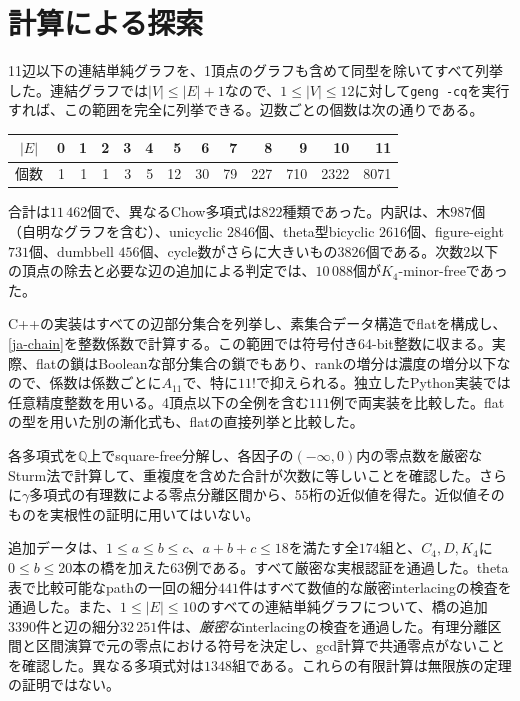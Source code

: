 \documentclass[12pt]{amsart}
\theoremstyle{definition}
\theoremstyle{remark}
\numberwithin{equation}{section}
\newcommand{\Q}{\mathbb{Q}}
\begin{document}
\section{計算による探索}
11辺以下の連結単純グラフを、1頂点のグラフも含めて同型を除いてすべて列挙した。連結グラフでは$|V|\leq|E|+1$なので、$1\leq|V|\leq12$に対して\texttt{geng -cq}を実行すれば、この範囲を完全に列挙できる。辺数ごとの個数は次の通りである。
\begin{center}\small
\begin{tabular}{c|rrrrrrrrrrrr}
$|E|$&0&1&2&3&4&5&6&7&8&9&10&11\\\hline
個数&1&1&1&3&5&12&30&79&227&710&2322&8071
\end{tabular}
\end{center}
合計は$11\,462$個で、異なるChow多項式は$822$種類であった。内訳は、木$987$個（自明なグラフを含む）、unicyclic $2846$個、theta型bicyclic $2616$個、figure-eight $731$個、dumbbell $456$個、cycle数がさらに大きいもの$3826$個である。次数2以下の頂点の除去と必要な辺の追加による判定では、$10\,088$個が$K_4$-minor-freeであった。

C++の実装はすべての辺部分集合を列挙し、素集合データ構造でflatを構成し、\eqref{ja-chain}を整数係数で計算する。この範囲では符号付き64-bit整数に収まる。実際、flatの鎖はBooleanな部分集合の鎖でもあり、rankの増分は濃度の増分以下なので、係数は係数ごとに$A_{11}$で、特に$11!$で抑えられる。独立したPython実装では任意精度整数を用いる。4頂点以下の全例を含む$111$例で両実装を比較した。flatの型を用いた別の漸化式も、flatの直接列挙と比較した。

各多項式を$\Q$上でsquare-free分解し、各因子の$(-\infty,0)$内の零点数を厳密なSturm法で計算して、重複度を含めた合計が次数に等しいことを確認した。さらに$\gamma$多項式の有理数による零点分離区間から、55桁の近似値を得た。近似値そのものを実根性の証明に用いてはいない。

追加データは、$1\leq a\leq b\leq c$、$a+b+c\leq18$を満たす全$174$組と、$C_4,D,K_4$に$0\leq b\leq20$本の橋を加えた$63$例である。すべて厳密な実根認証を通過した。theta表で比較可能なpathの一回の細分$441$件はすべて数値的な厳密interlacingの検査を通過した。また、$1\leq|E|\leq10$のすべての連結単純グラフについて、橋の追加$3390$件と辺の細分$32\,251$件は、\emph{厳密な}interlacingの検査を通過した。有理分離区間と区間演算で元の零点における符号を決定し、gcd計算で共通零点がないことを確認した。異なる多項式対は$1348$組である。これらの有限計算は無限族の定理の証明ではない。
\end{document}
